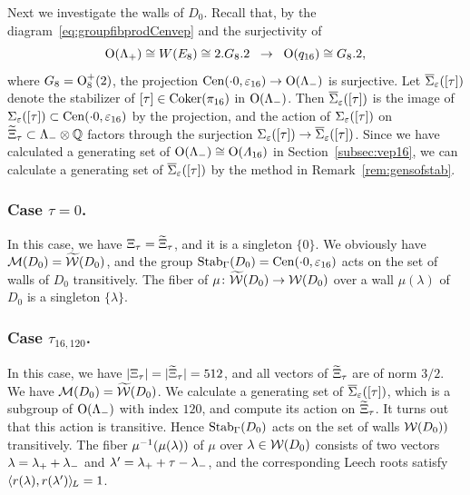 \documentclass{amsart} %
\begin{document}
Next we investigate the walls of $D_0$.
Recall that, 
by 
the diagram~\eqref{eq:groupfibprodCenvep} and the surjectivity of 
\[
\mathord{\mathrm{O}}(\Lambda_{+})\cong W(E_8)\cong 2.G_8 . 2\;\;\to\;\; \mathord{\mathrm{O}}(q_{16})\cong G_8. 2,
\]
where $G_8=\mathord{\mathrm{O}}^+_{8} (2)$,
the projection
$\mathrm{Cen}(\cdot 0, \varepsilon_{16})\to \mathord{\mathrm{O}}(\Lambda_{-})$ is surjective.
Let $\overline{\Sigma}_{\varepsilon} ([\tau])$ denote the stabilizer of $[\tau]\in \operatorname{Coker}(\pi_{16})$ in $ \mathord{\mathrm{O}}(\Lambda_{-})$.
Then $\overline{\Sigma}_{\varepsilon} ([\tau])$ is the image of $\Sigma_{\varepsilon} ([\tau])\subset \mathrm{Cen}(\cdot 0, \varepsilon_{16})$
by the projection, and 
the action of $\Sigma_{\varepsilon} ([\tau])$
on $\widetilde{\Xi}_{\tau}\subset \Lambda_{-}\otimes \mathord{\mathbb{Q}}$ 
factors through the surjection $\Sigma_{\varepsilon} ([\tau])\to\overline{\Sigma}_{\varepsilon} ([\tau])$.
Since we have calculated a generating set of $ \mathord{\mathrm{O}}(\Lambda_{-})\cong \mathord{\mathrm{O}}(\varLambda_{16})$
 in Section~\ref{subsec:vep16},
we can calculate a generating set of $\overline{\Sigma}_{\varepsilon} ([\tau])$
by the method in Remark~\ref{rem:gensofstab}.
%
\subsubsection{Case $\tau=0$.}
%
In this case,
we have $\Xi_{\tau}=\widetilde{\Xi}_{\tau}$,
and it is a singleton $\{0\}$.
We obviously have $\mathord{\mathcal{M}}(D_0)=\widetilde{\mathord{\mathcal{W}}}(D_0)$,
and the group $\operatorname{Stab}_{\Gamma}(D_0)=\mathrm{Cen}(\cdot 0, \varepsilon_{16})$ acts 
on the set of walls of $D_0$ transitively.
The fiber of $\mu\colon \widetilde{\mathord{\mathcal{W}}}(D_0)\to\mathord{\mathcal{W}}(D_0)$ 
over a wall $\mu(\lambda)$ of $D_0$ is a singleton $\{\lambda\}$.
%
%
\subsubsection{Case $\tau_{16, 120}$.}
%
In this case,
we have $|\Xi_{\tau}|=|\widetilde{\Xi}_{\tau}|=512$,
and all vectors of $\widetilde{\Xi}_{\tau}$ are of norm $3/2$.
We have $\mathord{\mathcal{M}}(D_0)=\widetilde{\mathord{\mathcal{W}}}(D_0)$.
We calculate a generating set of $\overline{\Sigma}_{\varepsilon} ([\tau])$,
which is a subgroup of $ \mathord{\mathrm{O}}(\Lambda_{-})$ with index $120$,
and compute its action on $\widetilde{\Xi}_{\tau}$.
It turns out that this action is transitive.
Hence $\operatorname{Stab}_{\Gamma}(D_0)$ acts on the set of walls $\mathord{\mathcal{W}}(D_0))$ transitively.
The fiber 
 $\mu^{-1}(\mu(\lambda))$ of $\mu$ over $\lambda\in \mathord{\mathcal{W}}(D_0)$ consists 
of two vectors
$\lambda={\lambda}_{+}+{\lambda}_{-}$ and $\lambda^{\prime}={\lambda}_{+}+\tau-{\lambda}_{-}$, and 
the corresponding Leech roots 
 satisfy
$\langle r(\lambda), r(\lambda^{\prime}) \rangle_{\hskip -1pt L}=1$.
%
\end{document}
